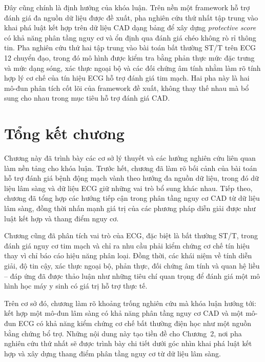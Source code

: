 Đây cũng chính là định hướng của khóa luận. Trên nền một framework hỗ trợ đánh giá đa nguồn dữ liệu được đề xuất, pha nghiên cứu thứ nhất tập trung vào khai phá luật kết hợp trên dữ liệu CAD dạng bảng để xây dựng \textit{protective score} có khả năng phân tầng nguy cơ và ổn định qua đánh giá chéo không rò rỉ thông tin. Pha nghiên cứu thứ hai tập trung vào bài toán bất thường ST/T trên ECG 12 chuyển đạo, trong đó mô hình được kiểm tra bằng phản thực mức đặc trưng và mức dạng sóng, xác thực ngoại bộ và các đối chứng âm tính nhằm làm rõ tính hợp lý cơ chế của tín hiệu ECG hỗ trợ đánh giá tim mạch. Hai pha này là hai mô-đun phân tích cốt lõi của framework đề xuất, không thay thế nhau mà bổ sung cho nhau trong mục tiêu hỗ trợ đánh giá CAD.

\blocksep

\section{Tổng kết chương}

\blocksep

Chương này đã trình bày các cơ sở lý thuyết và các hướng nghiên cứu liên quan làm nền tảng cho khóa luận. Trước hết, chương đã làm rõ bối cảnh của bài toán hỗ trợ đánh giá bệnh động mạch vành theo hướng đa nguồn dữ liệu, trong đó dữ liệu lâm sàng và dữ liệu ECG giữ những vai trò bổ sung khác nhau. Tiếp theo, chương đã tổng hợp các hướng tiếp cận trong phân tầng nguy cơ CAD từ dữ liệu lâm sàng, đồng thời nhấn mạnh giá trị của các phương pháp diễn giải được như luật kết hợp và thang điểm nguy cơ.

\blocksep

Chương cũng đã phân tích vai trò của ECG, đặc biệt là bất thường ST/T, trong đánh giá nguy cơ tim mạch và chỉ ra nhu cầu phải kiểm chứng cơ chế tín hiệu thay vì chỉ báo cáo hiệu năng phân loại. Đồng thời, các khái niệm về tính diễn giải, độ tin cậy, xác thực ngoại bộ, phản thực, đối chứng âm tính và quan hệ liều -- đáp ứng đã được thảo luận như những tiêu chí quan trọng để đánh giá một mô hình học máy y sinh có giá trị hỗ trợ thực tế.

\blocksep

Trên cơ sở đó, chương làm rõ khoảng trống nghiên cứu mà khóa luận hướng tới: kết hợp một mô-đun lâm sàng có khả năng phân tầng nguy cơ CAD và một mô-đun ECG có khả năng kiểm chứng cơ chế bất thường điện học như một nguồn bằng chứng bổ trợ. Những nội dung này tạo tiền đề cho Chương~2, nơi pha nghiên cứu thứ nhất sẽ được trình bày chi tiết dưới góc nhìn khai phá luật kết hợp và xây dựng thang điểm phân tầng nguy cơ từ dữ liệu lâm sàng.
